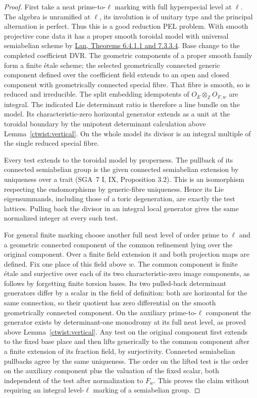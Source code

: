 \begin{proof}
First take a neat prime-to-\(\ell\) marking with full hyperspecial
level at \(\ell\). The algebra is unramified at \(\ell\), its
involution is of unitary type and the principal alternation is
perfect. Thus this is a good reduction PEL problem. With smooth
projective cone data it has a proper smooth toroidal model with
universal semiabelian scheme by
\href{https://www.kwlan.org/articles/cpt-PEL-type-thesis-revision-dense.pdf}
{Lan, Theorems 6.4.1.1 and 7.3.3.4}.
Base change to the completed coefficient DVR. The geometric
components of a proper smooth family form a finite étale scheme;
the selected geometrically connected generic component defined
over the coefficient field extends to an open and closed component
with geometrically connected special fibre. That fibre is smooth,
so is reduced and irreducible. The split embedding idempotents of
\(O_E\otimes_{\mathbb Z}O_{F,w}\) are integral. The indicated Lie
determinant ratio is therefore a line bundle on the model.
Its characteristic-zero horizontal generator extends as a unit at
the toroidal boundary by the unipotent determinant calculation
above Lemma~\ref{ctwist:vertical}. On the whole model its divisor
is an integral multiple of the single reduced special fibre.

Every test extends to the toroidal model by properness. The
pullback of its connected semiabelian group is the given connected
semiabelian extension by uniqueness over a trait (SGA~7 I, IX,
Proposition 3.2). This is an isomorphism respecting the endomorphisms
by generic-fibre uniqueness. Hence its Lie eigensummands, including
those of a toric degeneration, are exactly the test lattices.
Pulling back the divisor in an integral local generator gives the
same normalized integer at every such test.

For general finite marking choose another full neat level of order
prime to \(\ell\) and a geometric connected component of the common
refinement lying over the original component. Over a finite field
extension it and both projection maps are defined. Fix one place
of this field above \(w\). The common component is finite étale
and surjective over each of its two characteristic-zero image
components, as follows by forgetting finite torsion bases. Its two
pulled-back determinant generators differ by a scalar in the
field of definition: both are horizontal for the same connection,
so their quotient has zero differential on the smooth geometrically
connected component. On the auxiliary prime-to-\(\ell\) component
the generator exists by determinant-one monodromy at its full neat
level, as proved above Lemma~\ref{ctwist:vertical}. Any test on the
original component first extends to the fixed base place and
then lifts generically to the common component after a finite
extension of its fraction field, by surjectivity. Connected
semiabelian pullbacks agree by the same uniqueness. The order on
the lifted test is the order on the auxiliary component plus the
valuation of the fixed scalar, both independent of the test after
normalization to \(F_w\). This proves the claim without requiring
an integral level-\(\ell\) marking of a semiabelian group.
\end{proof}

